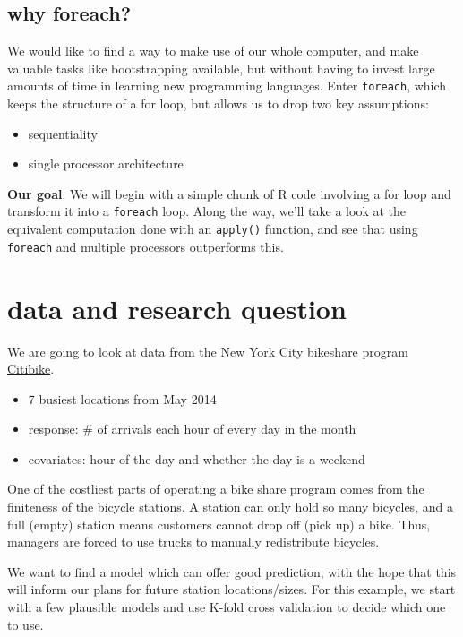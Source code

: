 \documentclass[]{article}
\begin{document}
\subsection{why foreach?}\label{why-foreach}

We would like to find a way to make use of our whole computer, and make
valuable tasks like bootstrapping available, but without having to
invest large amounts of time in learning new programming languages.
Enter \texttt{foreach}, which keeps the structure of a for loop, but
allows us to drop two key assumptions:

\begin{itemize}
\itemsep1pt\parskip0pt
\item
  sequentiality
\item
  single processor architecture
\end{itemize}

{\textbf{Our goal}}: We will begin with a simple chunk of R code
involving a for loop and transform it into a \texttt{foreach} loop.
Along the way, we'll take a look at the equivalent computation done with
an \texttt{apply()} function, and see that using \texttt{foreach} and
multiple processors outperforms this.

\section{data and research question}\label{data-and-research-question}

We are going to look at data from the New York City bikeshare program
\href{https://www.citibikenyc.com/}{Citibike}.

\begin{itemize}
\itemsep1pt\parskip0pt
\item
  7 busiest locations from May 2014
\item
  response: \# of arrivals each hour of every day in the month
\item
  covariates: hour of the day and whether the day is a weekend
\end{itemize}

One of the costliest parts of operating a bike share program comes from
the finiteness of the bicycle stations. A station can only hold so many
bicycles, and a full (empty) station means customers cannot drop off
(pick up) a bike. Thus, managers are forced to use trucks to manually
redistribute bicycles.

We want to find a model which can offer good prediction, with the hope
that this will inform our plans for future station locations/sizes. For
this example, we start with a few plausible models and use K-fold cross
validation to decide which one to use.
\end{document}
